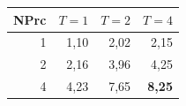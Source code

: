 \begin{tabular}{@{}rrrr@{}}
\toprule
NPrc & $T=1$ & $T=2$ & $T=4$ \\
\midrule
1 & 1{,}10 & 2{,}02 & 2{,}15 \\
2 & 2{,}16 & 3{,}96 & 4{,}25 \\
4 & 4{,}23 & 7{,}65 & \textbf{8{,}25} \\
\bottomrule
\end{tabular}
